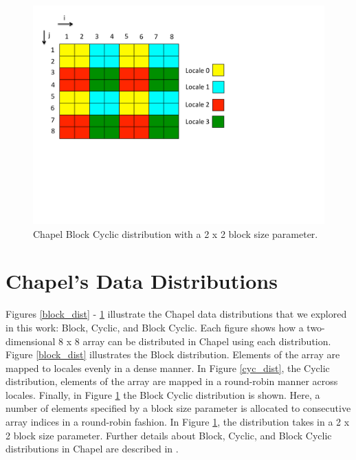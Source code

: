 \begin{figure}
\begin{center}
\includegraphics[scale=0.50]{./Figures/block_cyc_dist}
\caption{Chapel Block Cyclic distribution with a 2 x 2 block size parameter.}
\label{block_cyc_dist}
\end{center}
\end{figure}

\section{Chapel's Data Distributions}\label{sec:data_distributions} 

Figures \ref{block_dist} - \ref{block_cyc_dist} illustrate the Chapel data distributions that we explored in this work: Block, Cyclic, and Block Cyclic. Each figure shows how a two-dimensional 8 x 8 array can be distributed in Chapel using each distribution. Figure \ref{block_dist} illustrates the Block distribution. Elements of the array are mapped to locales evenly in a dense manner. In Figure \ref{cyc_dist}, the Cyclic distribution, elements of the array are mapped in a round-robin manner across locales. Finally, in Figure \ref{block_cyc_dist} the Block Cyclic distribution is shown. Here, a number of elements specified by a block size parameter is allocated to consecutive array indices in a round-robin fashion. In Figure \ref{block_cyc_dist}, the distribution takes in a 2 x 2 block size parameter. Further details about Block, Cyclic, and Block Cyclic distributions in Chapel are described in \cite{distributions}.


